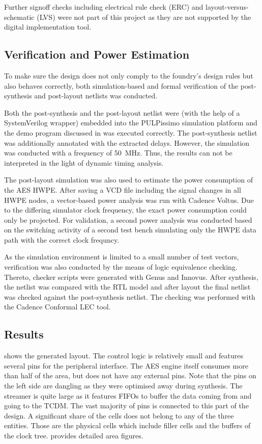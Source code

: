 \documentclass[a4paper, 12pt]{article}
\begin{document}
Further signoff checks including electrical rule check (ERC) and layout-versus-schematic (LVS) were not part of this project as they are not supported by the digital implementation tool.

\subsection{Verification and Power Estimation} \label{sec:asic:verification}

To make sure the design does not only comply to the foundry's design rules but also behaves correctly, both simulation-based and formal verification of the post-synthesis and post-layout netlists was conducted.

Both the post-synthesis and the post-layout netlist were (with the help of a SystemVerilog wrapper) embedded into the PULPissimo simulation platform and the demo program discussed in  was executed correctly. The post-synthesis netlist was additionally annotated with the extracted delays. However, the simulation was conducted with a frequency of \SI{50}{MHz}. Thus, the results can not be interpreted in the light of dynamic timing analysis.

The post-layout simulation was also used to estimate the power consumption of the AES HWPE. After saving a VCD file including the signal changes in all HWPE nodes, a vector-based power analysis was run with Cadence Voltus. Due to the differing simulator clock frequency, the exact power consumption could only be projected. For validation, a second power analysis was conducted based on the switching activity of a second test bench simulating only the HWPE data path with the correct clock frequncy.

As the simulation environment is limited to a small number of test vectors, verification was also conducted by the means of logic equivalence checking. Thereto, checker scripts were generated with Genus and Innovus. After synthesis, the netlist was compared with the RTL model and after layout the final netlist was checked against the post-synthesis netlist. The checking was performed with the Cadence Conformal LEC tool.

\subsection{Results} \label{sec:asic:results}

 shows the generated layout. The control logic is relatively small and features several pins for the peripheral interface. The AES engine itself consumes more than half of the area, but does not have any external pins. Note that the pins on the left side are dangling as they were optimised away during synthesis. The streamer is quite large as it features FIFOs to buffer the data coming from and going to the TCDM. The vast majority of pins is connected to this part of the design. A significant share of the cells does not belong to any of the three entities. Those are the physical cells which include filler cells and the buffers of the clock tree.  provides detailed area figures.
\end{document}
